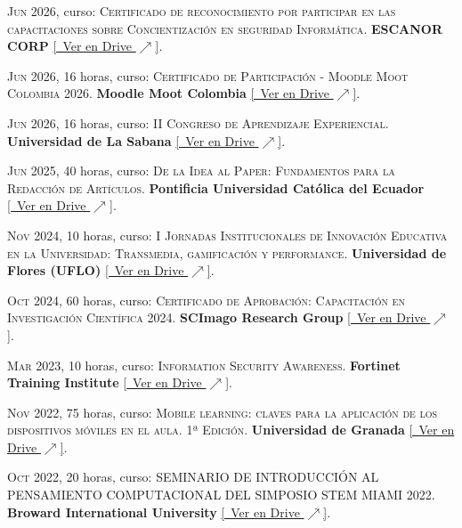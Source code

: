 \documentclass[a4paper]{article}
\begin{document}
\textsc{Jun} 2026, curso: \textsc{Certificado de reconocimiento por participar en las capacitaciones sobre Concientización en seguridad Informática}.
\textbf{ESCANOR CORP} \small \href{https://drive.google.com/file/d/1KR63fHpe-SwnfXI4Dm1grjSeykxl4DST/view}{[\faGoogleDrive~Ver en Drive $\nearrow$]}.

\textsc{Jun} 2026, 16 horas, curso: \textsc{Certificado de Participación - Moodle Moot Colombia 2026}.
\textbf{Moodle Moot Colombia} \small \href{https://drive.google.com/file/d/1Jcf4TV2uDNY0Z7h0T8bMPfdxFvp3RxhW/view}{[\faGoogleDrive~Ver en Drive $\nearrow$]}.

\textsc{Jun} 2026, 16 horas, curso: \textsc{II Congreso de Aprendizaje Experiencial}.
\textbf{Universidad de La Sabana} \small \href{https://drive.google.com/file/d/12SIRVxOruUWVDFiT3I1He9CowDuiBxWS/view}{[\faGoogleDrive~Ver en Drive $\nearrow$]}.

\textsc{Jun} 2025, 40 horas, curso: \textsc{De la Idea al Paper: Fundamentos para la Redacción de Artículos}.
\textbf{Pontificia Universidad Católica del Ecuador} \small \href{https://drive.google.com/file/d/1-kpsEJt9VwqVp3plByY8DqfQCy3IFUc6/view}{[\faGoogleDrive~Ver en Drive $\nearrow$]}.

\textsc{Nov} 2024, 10 horas, curso: \textsc{I Jornadas Institucionales de Innovación Educativa en la Universidad: Transmedia, gamificación y performance}.
\textbf{Universidad de Flores (UFLO)} \small \href{https://drive.google.com/file/d/1X93-l8mrMmVHVkzmTvf_R6eE1RHlUadd/view}{[\faGoogleDrive~Ver en Drive $\nearrow$]}.

\textsc{Oct} 2024, 60 horas, curso: \textsc{Certificado de Aprobación: Capacitación en Investigación Científica 2024}.
\textbf{SCImago Research Group} \small \href{https://drive.google.com/file/d/1IkIXBqRGgTO6dIXnTwrqYAU01b94T7-J/view}{[\faGoogleDrive~Ver en Drive $\nearrow$]}.

\textsc{Mar} 2023, 10 horas, curso: \textsc{Information Security Awareness}.
\textbf{Fortinet Training Institute} \small \href{https://drive.google.com/file/d/1Gr_4JXHCvuZhbyVSGt9jMjiBsnaGAIB9/view}{[\faGoogleDrive~Ver en Drive $\nearrow$]}.

\textsc{Nov} 2022, 75 horas, curso: \textsc{Mobile learning: claves para la aplicación de los dispositivos móviles en el aula. 1ª Edición}.
\textbf{Universidad de Granada} \small \href{https://drive.google.com/file/d/16C9EPOovghCqMa7ts5AH2-VW64z1vzsO/view}{[\faGoogleDrive~Ver en Drive $\nearrow$]}.

\textsc{Oct} 2022, 20 horas, curso: \textsc{SEMINARIO DE INTRODUCCIÓN AL PENSAMIENTO COMPUTACIONAL DEL SIMPOSIO STEM MIAMI 2022}.
\textbf{Broward International University} \small \href{https://drive.google.com/file/d/1tTIcv-AtnPWpN9sOtzAb-V2QkLgq57ah/view}{[\faGoogleDrive~Ver en Drive $\nearrow$]}.
\end{document}
